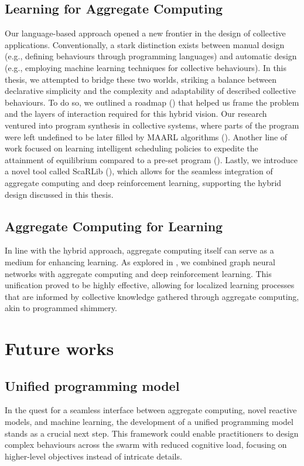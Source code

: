 \subsection*{Learning for Aggregate Computing}
Our language-based approach opened a new frontier in the design of collective applications. 
 Conventionally, a stark distinction exists between manual design (e.g., defining behaviours through programming languages) and automatic design (e.g., employing machine learning techniques for collective behaviours). 
% 
In this thesis, we attempted to bridge these two worlds,
 striking a balance between declarative simplicity and the complexity and adaptability of described collective behaviours. 
%
 To do so, we outlined a roadmap () that helped us frame the problem and the layers of interaction required for this hybrid vision.
% 
 Our research ventured into program synthesis in collective systems, 
 where parts of the program were left undefined to be later filled by \ac{MAARL} algorithms (). 
% 
Another line of work focused on learning intelligent scheduling policies to expedite the attainment of equilibrium compared to a pre-set program ().
%
Lastly, we introduce a novel tool called ScaRLib (), 
 which allows for the seamless integration of aggregate computing and deep reinforcement learning, 
 supporting the hybrid design discussed in this thesis.
\subsection*{Aggregate Computing for Learning}

In line with the hybrid approach, aggregate computing itself can serve as a medium for enhancing learning. As explored in , 
 we combined graph neural networks with aggregate computing and deep reinforcement learning. 
 This unification proved to be highly effective, 
 allowing for localized learning processes that are informed by collective knowledge gathered through aggregate computing, akin to programmed shimmery.

\section{Future works}

\subsection*{Unified programming model}
In the quest for a seamless interface between aggregate computing, novel reactive models, and machine learning, 
 the development of a unified programming model stands as a crucial next step.
% 
This framework could enable practitioners to design complex behaviours across the swarm with reduced cognitive load, 
 focusing on higher-level objectives instead of intricate details. 

